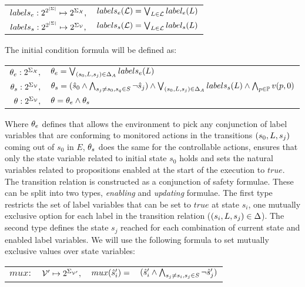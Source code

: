 \begin{center}
	\begin{tabular}{r l}
		$labels_e:2^{2^{|\Sigma|}}\mapsto 2^{\Sigma_{{\mathcal{X}}}},$ &
		$labels_e(\mathcal{L}) = \bigvee_{L \in \mathcal{L}}label_e(L)$\\
		$labels_s:2^{2^{|\Sigma|}}\mapsto 2^{\Sigma_{{\mathcal{V}}}},$ &
		$labels_s(\mathcal{L}) = \bigvee_{L \in \mathcal{L}}label_s(L)$\\
	\end{tabular}
\end{center}


The initial condition formula will be defined as:
\begin{center}
	\begin{tabular}{r l}
		${\theta_e}:2^{\Sigma_{{\mathcal{X}}}},$ &
		${\theta_e} = \bigvee_{(s_0,L,s_j) \in \Delta_A}labels_e(L)$\\
		${\theta_s}:2^{\Sigma_{{\mathcal{V}}}},$ &
		${\theta_s} = (\hat{s}_{0} \wedge\bigwedge_{s_j \neq s_0, s_q \in S}\neg \hat{s}_{j}) \wedge \bigvee_{(s_0,L,s_j) \in \Delta_A}labels_s(L) \wedge \bigwedge_{p \in \mathbb{P}}v(p,0)$\\
		$\theta:2^{\Sigma_{{\mathcal{V}}}},$ &
		$\theta = {\theta_e} \wedge {\theta_s}$\\		
	\end{tabular}
\end{center}

Where ${\theta_e}$ defines that allows the environment to pick any conjunction of label variables that are conforming to monitored actions in the transitions $(s_0, L, s_j)$ coming out of $s_0$ in $E$, ${\theta_s}$ does the same for the controllable actions, ensures that only the state variable related to initial state $s_0$ holds and sets the natural variables related to propositions enabled at the start of the execution to $true$.
The transition relation is constructed as a conjunction of safety formulae. These can be split into two types, \emph{enabling} and \emph{updating} formulae. The first type restricts the set of label variables that can be set to $true$ at state $s_i$, one mutually exclusive option for each label \actionLabel in the transition relation ($(s_i,L,s_j) \in \Delta$). The second type defines the state $s_j$ reached for each combination of current state and enabled label variables. 
We will use the following formula to set mutually exclusive values over state variables:

\begin{center}
	\begin{tabular}{r r r l}
$mux:$&${\mathcal{V}}' \mapsto 2^{\Sigma_{{\mathcal{V}}'}},$&$mux(\hat{s}_{i}') = $&$(\hat{s}_{i}' \wedge\bigwedge_{s_j \neq s_i, s_j \in S}\neg \hat{s}_{j}')$
	\end{tabular}
\end{center}

